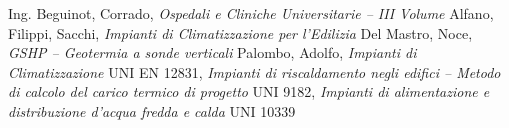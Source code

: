 \begin{thebibliography}{9}
	Ing. Beguinot, Corrado, \emph{Ospedali e Cliniche Universitarie -- \emph{III Volume}}
	Alfano, Filippi, Sacchi, \emph{Impianti di Climatizzazione per l'Edilizia}
	Del Mastro, Noce, \emph{GSHP -- \emph{Geotermia a sonde verticali}}
	Palombo, Adolfo, \emph{Impianti di Climatizzazione}
	 UNI EN 12831, \emph{Impianti di riscaldamento negli edifici -- \emph{Metodo di calcolo del carico termico di progetto}}
	 UNI 9182, \emph{Impianti di alimentazione e distribuzione d'acqua fredda e calda}
	 UNI 10339
\end{thebibliography}
\thispagestyle{empty}
